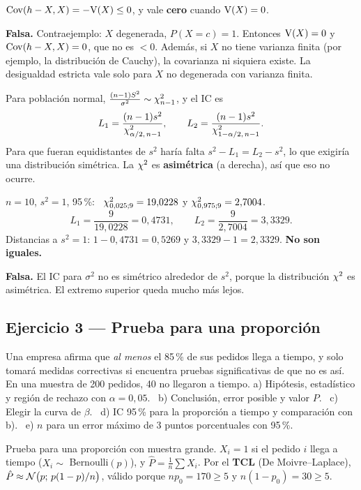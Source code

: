  $\mathrm{Cov}(h-X,X)=-\mathrm{V}(X)\le0$, y vale \textbf{cero} cuando $\mathrm{V}(X)=0$.
\begin{resp}
\textbf{Falsa.} Contraejemplo: $X$ degenerada, $P(X=c)=1$. Entonces $\mathrm{V}(X)=0$ y $\mathrm{Cov}(h-X,X)=0$, que no es $<0$.
Además, si $X$ no tiene varianza finita (por ejemplo, la distribución de Cauchy), la covarianza ni siquiera existe. La desigualdad estricta vale solo para $X$ no degenerada con varianza finita.
\end{resp}

 Para población normal, $\frac{(n-1)S^2}{\sigma^2}\sim\chi^2_{n-1}$, y el IC es
\[
L_1=\frac{(n-1)s^2}{\chi^2_{\alpha/2,\,n-1}},\qquad L_2=\frac{(n-1)s^2}{\chi^2_{1-\alpha/2,\,n-1}}.
\]
Para que fueran equidistantes de $s^2$ haría falta $s^2-L_1=L_2-s^2$, lo que exigiría una distribución simétrica. La $\chi^2$ es \textbf{asimétrica} (a derecha), así que eso no ocurre.

 $n=10$, $s^2=1$, 95\,\%: \ $\chi^2_{0,025;9}=19{,}0228$ y $\chi^2_{0,975;9}=2{,}7004$.
\[
L_1=\frac{9}{19{,}0228}=0{,}4731,\qquad L_2=\frac{9}{2{,}7004}=3{,}3329.
\]
Distancias a $s^2=1$: $1-0{,}4731=0{,}5269$ y $3{,}3329-1=2{,}3329$. \textbf{No son iguales.}
\begin{resp}
\textbf{Falsa.} El IC para $\sigma^2$ no es simétrico alrededor de $s^2$, porque la distribución $\chi^2$ es asimétrica. El extremo superior queda mucho más lejos.
\end{resp}

\subsection{Ejercicio 3 --- Prueba para una proporción}
\begin{enun}
Una empresa afirma que \emph{al menos} el 85\,\% de sus pedidos llega a tiempo, y solo tomará medidas correctivas si encuentra pruebas significativas de que no es así. En una muestra de 200 pedidos, 40 no llegaron a tiempo.
a) Hipótesis, estadístico y región de rechazo con $\alpha=0{,}05$. \ b) Conclusión, error posible y valor $P$. \ c) Elegir la curva de $\beta$. \ d) IC 95\,\% para la proporción a tiempo y comparación con b). \ e) $n$ para un error máximo de 3 puntos porcentuales con 95\,\%.
\end{enun}
\begin{metodo}
Prueba para una proporción con muestra grande. $X_i=1$ si el pedido $i$ llega a tiempo ($X_i\sim$ Bernoulli$(p)$), y $\hat P=\frac1n\sum X_i$.
Por el \textbf{TCL} (De Moivre--Laplace), $\hat P\approx\mathcal{N}\big(p;\,p(1-p)/n\big)$, válido porque $np_0=170\ge5$ y $n(1-p_0)=30\ge5$.
\end{metodo}

